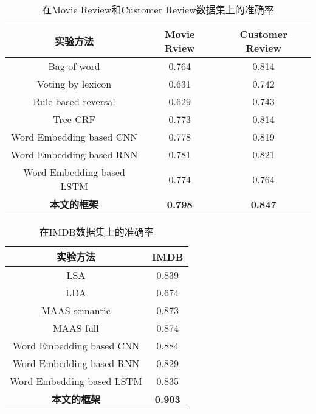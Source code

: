 \begin{table}
\centering
\caption{在Movie Review和Customer Review数据集上的准确率}
\label{Table:Table1}
\begin{tabular}{@{}ccc@{}}
\hline
实验方法                    & Movie Rview    & Customer Review \\ \hline
Bag-of-word               & 0.764          & 0.814           \\
Voting by lexicon         & 0.631          & 0.742           \\
Rule-based reversal       & 0.629          & 0.743           \\
Tree-CRF                  & 0.773          & 0.814           \\
Word Embedding based CNN  & 0.778          & 0.819           \\
Word Embedding based RNN  & 0.781          & 0.821           \\
Word Embedding based LSTM & 0.774          & 0.764           \\ 
\textbf{本文的框架}    & \textbf{0.798} & \textbf{0.847}  \\ \hline
\end{tabular}
\end{table}

\begin{table}
\centering
\caption{在IMDB数据集上的准确率}
\label{Table:Table2}
\begin{tabular}{@{}cc@{}}
\hline
实验方法                    & IMDB           \\ \hline
LSA                       & 0.839          \\
LDA                       & 0.674          \\
MAAS semantic             & 0.873          \\
MAAS full                 & 0.874          \\
Word Embedding based CNN  & 0.884          \\
Word Embedding based RNN  & 0.829          \\
Word Embedding based LSTM & 0.835          \\
\textbf{本文的框架}    & \textbf{0.903} \\ \hline
\end{tabular}
\end{table}

